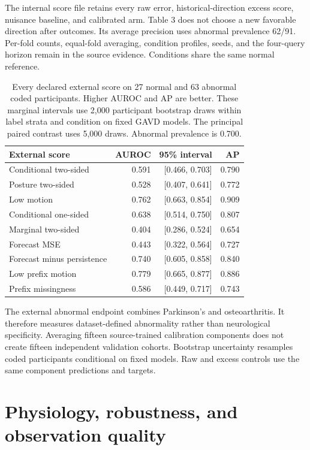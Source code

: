 \documentclass[letterpaper]{article}
\begin{document}
The internal score file retains every raw error, historical-direction excess score, nuisance baseline, and calibrated arm. Table 3 does not choose a new favorable direction after outcomes. Its average precision uses abnormal prevalence 62/91. Per-fold counts, equal-fold averaging, condition profiles, seeds, and the four-query horizon remain in the source evidence. Conditions share the same normal reference.

\begin{table}[t]
\centering
\footnotesize
\begin{tabular}{lrrr}
\toprule
External score & AUROC & 95\% interval & AP \\
\midrule
Conditional two-sided & 0.591 & [0.466, 0.703] & 0.790 \\
Posture two-sided & 0.528 & [0.407, 0.641] & 0.772 \\
Low motion & 0.762 & [0.663, 0.854] & 0.909 \\
Conditional one-sided & 0.638 & [0.514, 0.750] & 0.807 \\
Marginal two-sided & 0.404 & [0.286, 0.524] & 0.654 \\
Forecast MSE & 0.443 & [0.322, 0.564] & 0.727 \\
Forecast minus persistence & 0.740 & [0.605, 0.858] & 0.840 \\
Low prefix motion & 0.779 & [0.665, 0.877] & 0.886 \\
Prefix missingness & 0.586 & [0.449, 0.717] & 0.743 \\
\bottomrule
\end{tabular}
\caption{Every declared external score on 27 normal and 63 abnormal coded participants. Higher AUROC and AP are better. These marginal intervals use 2,000 participant bootstrap draws within label strata and condition on fixed GAVD models. The principal paired contrast uses 5,000 draws. Abnormal prevalence is 0.700.}
\label{tab:external_rankings}
\end{table}

The external abnormal endpoint combines Parkinson's and osteoarthritis. It therefore measures dataset-defined abnormality rather than neurological specificity. Averaging fifteen source-trained calibration components does not create fifteen independent validation cohorts. Bootstrap uncertainty resamples coded participants conditional on fixed models. Raw and excess controls use the same component predictions and targets.

\section{Physiology, robustness, and observation quality}
\end{document}
